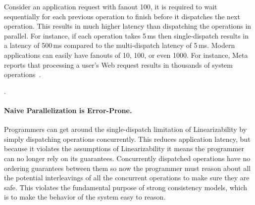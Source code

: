 Consider an application request with fanout 100, it is required to wait sequentially for each previous operation to finish before it dispatches the next operation. This results in much higher latency than dispatching the operations in parallel. For instance, if each operation takes 5\,ms then single-dispatch results in a latency of 500\,ms compared to the multi-dispatch latency of 5\,ms.
Modern applications can easily have fanouts of 10, 100, or even 1000. For instance, Meta reports that processing a user's Web request results in thousands of system operations~\cite{ajoux2015challenges}.

.



\paragraph{Naive Parallelization is Error-Prone.}
Programmers can get around the single-dispatch limitation of Linearizability by simply dispatching operations concurrently.
This reduces application latency, but because it violates the assumptions of Linearizability it means the programmer can no longer rely on its guarantees. Concurrently dispatched operations have no ordering guarantees between them so now the programmer must reason about all the potential interleavings of all the concurrent operations to make sure they are safe. This violates the fundamental purpose of strong consistency models, which is to make the behavior of the system easy to reason.


